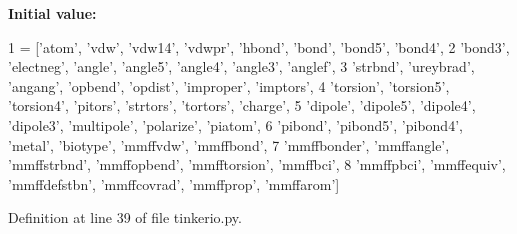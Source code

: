 {\bfseries Initial value\+:}
\begin{DoxyCode}
1 =  [\textcolor{stringliteral}{'atom'}, \textcolor{stringliteral}{'vdw'}, \textcolor{stringliteral}{'vdw14'}, \textcolor{stringliteral}{'vdwpr'}, \textcolor{stringliteral}{'hbond'}, \textcolor{stringliteral}{'bond'}, \textcolor{stringliteral}{'bond5'}, \textcolor{stringliteral}{'bond4'},
2         \textcolor{stringliteral}{'bond3'}, \textcolor{stringliteral}{'electneg'}, \textcolor{stringliteral}{'angle'}, \textcolor{stringliteral}{'angle5'}, \textcolor{stringliteral}{'angle4'}, \textcolor{stringliteral}{'angle3'}, \textcolor{stringliteral}{'anglef'},
3         \textcolor{stringliteral}{'strbnd'}, \textcolor{stringliteral}{'ureybrad'}, \textcolor{stringliteral}{'angang'}, \textcolor{stringliteral}{'opbend'}, \textcolor{stringliteral}{'opdist'}, \textcolor{stringliteral}{'improper'}, \textcolor{stringliteral}{'imptors'},
4         \textcolor{stringliteral}{'torsion'}, \textcolor{stringliteral}{'torsion5'}, \textcolor{stringliteral}{'torsion4'}, \textcolor{stringliteral}{'pitors'}, \textcolor{stringliteral}{'strtors'}, \textcolor{stringliteral}{'tortors'}, \textcolor{stringliteral}{'charge'},
5         \textcolor{stringliteral}{'dipole'}, \textcolor{stringliteral}{'dipole5'}, \textcolor{stringliteral}{'dipole4'}, \textcolor{stringliteral}{'dipole3'}, \textcolor{stringliteral}{'multipole'}, \textcolor{stringliteral}{'polarize'}, \textcolor{stringliteral}{'piatom'},
6         \textcolor{stringliteral}{'pibond'}, \textcolor{stringliteral}{'pibond5'}, \textcolor{stringliteral}{'pibond4'}, \textcolor{stringliteral}{'metal'}, \textcolor{stringliteral}{'biotype'}, \textcolor{stringliteral}{'mmffvdw'}, \textcolor{stringliteral}{'mmffbond'},
7         \textcolor{stringliteral}{'mmffbonder'}, \textcolor{stringliteral}{'mmffangle'}, \textcolor{stringliteral}{'mmffstrbnd'}, \textcolor{stringliteral}{'mmffopbend'}, \textcolor{stringliteral}{'mmfftorsion'}, \textcolor{stringliteral}{'mmffbci'},
8         \textcolor{stringliteral}{'mmffpbci'}, \textcolor{stringliteral}{'mmffequiv'}, \textcolor{stringliteral}{'mmffdefstbn'}, \textcolor{stringliteral}{'mmffcovrad'}, \textcolor{stringliteral}{'mmffprop'}, \textcolor{stringliteral}{'mmffarom'}]
\end{DoxyCode}


Definition at line 39 of file tinkerio.\+py.

\mbox{\label{namespacesrc_1_1tinkerio_a0a06196607dcb099012894f7997ea81a}} 
